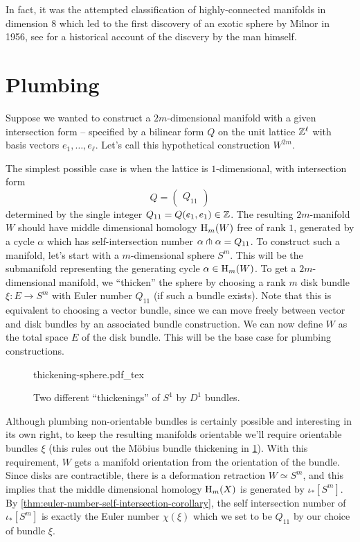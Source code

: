 \begin{remark}
	In fact, it was the attempted classification of highly-connected manifolds in dimension $8$ which led to the first discovery of an exotic sphere by Milnor in 1956, see \cite{milnor2000exotic} for a historical account of the discvery by the man himself.
\end{remark}

\section{Plumbing}

Suppose we wanted to construct a $2m$-dimensional manifold with a given intersection form -- specified by a bilinear form $Q$ on the unit lattice $\mathbb{Z}^\ell$ with basis vectors $e_1,\ldots, e_\ell$. Let's call this hypothetical construction $W^{2m}$.

The simplest possible case is when the lattice is $1$-dimensional, with intersection form
\[
	Q = \begin{pmatrix} Q_{11}\end{pmatrix}
\]
determined by the single integer $Q_{11}=Q(e_1,e_1)\in \mathbb{Z}$.
The resulting $2m$-manifold $W$ should have middle dimensional homology $\operatorname{H}_m(W)$ free of rank $1$, generated by a cycle $\alpha$ which has self-intersection number $\alpha\pitchfork \alpha = Q_{11}$. To construct such a manifold, let's start with a $m$-dimensional sphere $S^m$. This will be the submanifold representing the generating cycle $\alpha\in \operatorname{H}_m(W)$. To get a $2m$-dimensional manifold, we ``thicken'' the sphere by choosing a rank $m$ disk bundle $\xi : E \to S^m$ with Euler number $Q_{11}$ (if such a bundle exists). Note that this is equivalent to choosing a vector bundle, since we can move freely between vector and disk bundles by an associated bundle construction. We can now define $W$ as the total space $E$ of the disk bundle. This will be the base case for plumbing constructions.
\begin{figure}[ht]
	\centering
	{thickening-sphere.pdf_tex}
	\caption{Two different ``thickenings'' of $S^1$ by $D^1$ bundles.}\label{fig:thickening-sphere}
\end{figure}

Although plumbing non-orientable bundles is certainly possible and interesting in its own right, to keep the resulting manifolds orientable we'll require orientable bundles $\xi$ (this rules out the M\"obius bundle thickening in \cref{fig:thickening-sphere}). With this requirement, $W$ gets a manifold orientation from the orientation of the bundle.
Since disks are contractible, there is a deformation retraction $W\simeq S^m$, and this implies that the middle dimensional homology $\operatorname{H}_m(X)$ is generated by $\iota_*[S^m]$. By \cref{thm:euler-number-self-intersection-corollary}, the self intersection number of $\iota_*[S^m]$ is exactly the Euler number $\chi(\xi)$ which we set to be $Q_{11}$ by our choice of bundle $\xi$.

